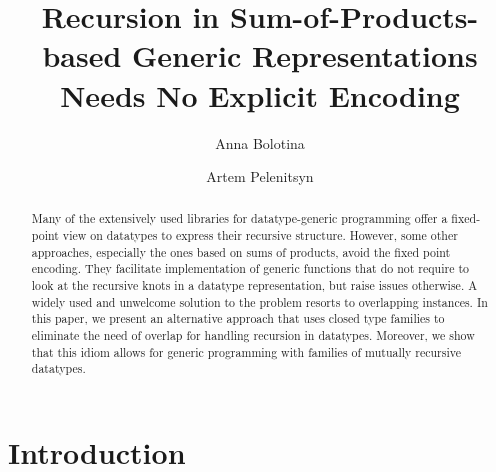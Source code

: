 \documentclass[sigplan,screen,review,anonymous]{acmart}
\begin{document}
%
\title{Recursion in Sum-of-Products-based Generic Representations Needs No Explicit Encoding}
%
%
\author{Anna Bolotina \and
Artem Pelenitsyn
}
%
%
%
\begin{abstract}
Many of the extensively used libraries for datatype-generic programming offer a fixed-point view on datatypes to express their recursive structure. However, some other approaches, especially the ones based on sums of products, avoid the fixed point encoding. They facilitate implementation of generic functions that do not require to look at the recursive knots in a datatype representation, but raise issues otherwise. A widely used and unwelcome solution to the problem resorts to overlapping instances. In this paper, we present an alternative approach that uses closed type families to eliminate the need of overlap for handling recursion in datatypes. Moreover, we show that this idiom allows for generic programming with families of mutually recursive datatypes.

\end{abstract}


\maketitle

\section{Introduction}
\label{sec:introduction}
\end{document}
